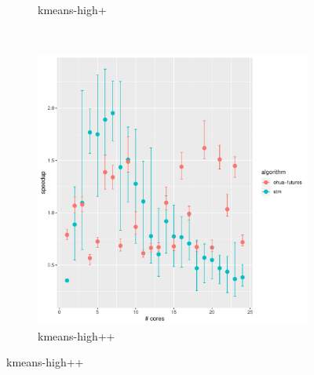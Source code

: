 \begin{figure}
\begin{subfigure}[t]{.32\textwidth}
        \caption{kmeans-high+}%
    \end{subfigure}%
    ~
    \begin{subfigure}[t]{.32\textwidth}
        \includegraphics[width=\textwidth,keepaspectratio]{gfx/results/kmeans/kmeans-high++}
        \caption{kmeans-high++}%
    \end{subfigure}%


\end{figure}

